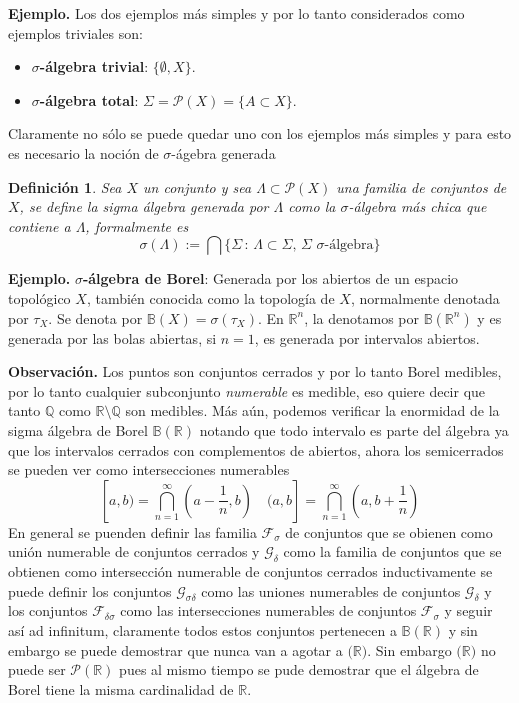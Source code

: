 \documentclass[letterpaper]{book}
\newtheorem{def.}{Definici\'on}[section]
\newcommand{\rac}{\ensuremath{ \mathbb Q }}
\newcommand{\eje}{{\noindent \sc \textbf{Ejemplo. }}}
\newcommand{\obs}{{\noindent \sc \textbf{Observación. }}}
\newcommand{\sig}{\ensuremath{\Sigma}}
\newcommand{\re}{\ensuremath{\mathbb R }}
\begin{document}
\eje Los dos ejemplos más simples y por lo tanto considerados como ejemplos triviales son:
\begin{itemize}
    \item \textbf{$\sigma$-álgebra trivial}: $\{\emptyset, X\}$.
    \item \textbf{$\sigma$-álgebra total}: $\sig=\mathcal{P}(X)=\{A\subset X\}$.
\end{itemize}

Claramente no sólo se puede quedar uno con los ejemplos más simples y para esto es necesario la noción de $\sigma$-ágebra generada
\begin{def.}
  Sea $X$ un conjunto y sea $\Lambda\subset\mathcal{P}(X)$ una familia de conjuntos de $X$, se define la sigma álgebra generada por $\Lambda$ como la $\sigma$-álgebra más chica que contiene a $\Lambda$, formalmente es
  \[
  \sigma(\Lambda):=\bigcap\{\sig\,:\,\Lambda\subset\sig,\,\sig\,\,\sigma\text{-álgebra}\}
  \]
\end{def.}
\eje \textbf{$\sigma$-álgebra de Borel}: Generada por los abiertos de un espacio topológico $X$, también conocida como la topología de $X$, normalmente denotada por $\tau_X$. Se denota por $\mathbb{B}(X)=\sigma(\tau_X)$. En $\mathbb{R}^n$, la denotamos por $\mathbb{B}(\mathbb{R}^n)$ y es generada por las bolas abiertas, si $n=1$, es generada por intervalos abiertos.

\obs Los puntos son conjuntos cerrados y por lo tanto Borel medibles, por lo tanto cualquier subconjunto \emph{numerable} es medible, eso quiere decir que tanto $\rac$ como $\re\setminus\rac$ son medibles. Más aún, podemos verificar la enormidad de la sigma álgebra de Borel $\mathbb{B}(\re)$ notando que todo intervalo es parte del álgebra ya que los intervalos cerrados con complementos de abiertos, ahora los semicerrados se pueden ver como intersecciones numerables
\[
[a,b)=\bigcap_{n=1}^{\infty}(a-\frac{1}{n},b)\quad(a,b]=\bigcap_{n=1}^{\infty}(a,b+\frac{1}{n})
\]
En general se puenden definir las familia $\mathcal{F}_{\sigma}$ de conjuntos que se obienen como unión numerable de conjuntos cerrados y $\mathcal{G}_{\delta}$ como la familia de conjuntos que se obtienen como intersección numerable de conjuntos cerrados inductivamente se puede definir los conjuntos $\mathcal{G}_{\sigma\delta}$ como las uniones numerables de conjuntos $\mathcal{G}_{\delta}$ y los conjuntos $\mathcal{F}_{\delta\sigma}$ como las intersecciones numerables de conjuntos $\mathcal{F}_{\sigma}$ y seguir así ad infinitum, claramente todos estos conjuntos pertenecen a $\mathbb{B}(\re)$ y sin embargo se puede demostrar que nunca van a agotar a $\mathbb(\re)$. Sin embargo $\mathbb(\re)$ no puede ser $\mathcal{P}(\re)$ pues al mismo tiempo se pude demostrar que el álgebra de Borel tiene la misma cardinalidad de $\re$.
\end{document}
